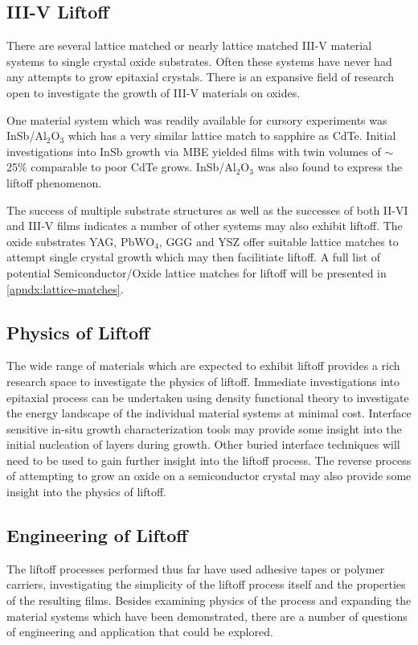 \subsection{III-V Liftoff} There are several lattice matched or nearly lattice matched III-V material systems to single crystal oxide substrates.
Often these systems have never had any attempts to grow epitaxial crystals.
There is an expansive field of research open to investigate the growth of III-V materials on oxides.

One material system which was readily available for cursory experiments was InSb/Al\(_2\)O\(_3\) which has a very similar lattice match to sapphire as CdTe.
Initial investigations into InSb growth via MBE yielded films with twin volumes of \(\sim\)25\% comparable to poor CdTe grows. InSb/Al\(_2\)O\(_3\) was also found to express the liftoff phenomenon.

The success of multiple substrate structures as well as the successes of both II-VI and III-V films indicates a number of other systems may also exhibit liftoff.
The oxide substrates YAG, PbWO\(_4\), GGG and YSZ offer suitable lattice matches to attempt single crystal growth which may then facilitiate liftoff.
A full list of potential Semiconductor/Oxide lattice matches for liftoff will be presented in \cref{apndx:lattice-matches}.

\subsection{Physics of Liftoff} The wide range of materials which are expected to exhibit liftoff provides a rich research space to investigate the physics of liftoff.
Immediate investigations into epitaxial process can be undertaken using density functional theory to investigate the energy landscape of the individual material systems at minimal cost.
Interface sensitive in-situ growth characterization tools may provide some insight into the initial nucleation of layers during growth.
Other buried interface techniques will need to be used to gain further insight into the liftoff process.
The reverse process of attempting to grow an oxide on a semiconductor crystal may also provide some insight into the physics of liftoff.

\subsection{Engineering of Liftoff} The liftoff processes performed thus far have used adhesive tapes or polymer carriers, investigating the simplicity of the liftoff process itself and the properties of the resulting films.
Besides examining physics of the process and expanding the material systems which have been demonstrated, there are a number of questions of engineering and application that could be explored.

